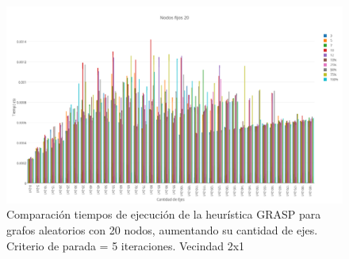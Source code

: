   \begin{figure}[h!]
   \begin{center}
 	\includegraphics[scale=0.35]{imagenes/grasp/20nodos-5repes-v1.png}
 	\caption{Comparaci\'on tiempos de ejecuci\'on de la heur\'istica GRASP para grafos aleatorios con 20 nodos, aumentando su cantidad de ejes. Criterio de parada = 5 iteraciones. Vecindad 2x1}
   \end{center}
 \end{figure}
\newpage

